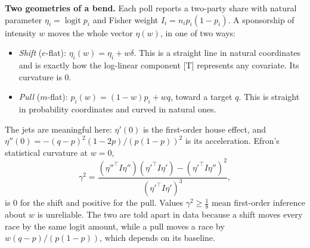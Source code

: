 \documentclass[11pt]{article}
\theoremstyle{definition}
\theoremstyle{remark}
\begin{document}
\textbf{Two geometries of a bend.} Each poll reports a two-party share with natural parameter $\eta_i=\operatorname{logit}p_i$ and Fisher weight $I_i=n_ip_i(1-p_i)$. A sponsorship of intensity $w$ moves the whole vector $\eta(w)$, in one of two ways:
\begin{itemize}
  \item \emph{Shift} ($e$-flat): $\eta_i(w)=\eta_i+w\delta$. This is a straight line in natural coordinates and is exactly how the log-linear component [T] represents any covariate. Its curvature is $0$.
  \item \emph{Pull} ($m$-flat): $p_i(w)=(1-w)p_i+wq$, toward a target $q$. This is straight in probability coordinates and curved in natural ones.
\end{itemize}
The jets are meaningful here: $\eta'(0)$ is the first-order house effect, and $\eta''(0)=-(q-p)^2(1-2p)/(p(1-p))^2$ is its acceleration. Efron's statistical curvature \cite{efron75} at $w=0$,
\[ \gamma^2=\frac{(\eta''^\top I\eta'')(\eta'^\top I\eta')-(\eta'^\top I\eta'')^2}{(\eta'^\top I\eta')^3}, \]
is $0$ for the shift and positive for the pull. Values $\gamma^2\ge\tfrac18$ mean first-order inference about $w$ is unreliable. The two are told apart in data because a shift moves every race by the same logit amount, while a pull moves a race by $w(q-p)/(p(1-p))$, which depends on its baseline.
\end{document}
